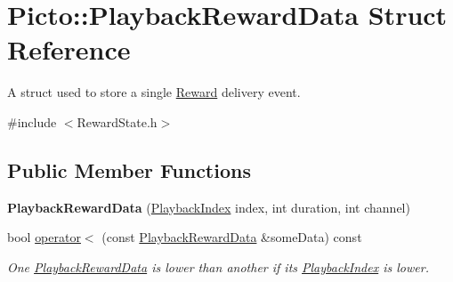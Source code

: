 \hypertarget{struct_picto_1_1_playback_reward_data}{\section{Picto\-:\-:Playback\-Reward\-Data Struct Reference}
\label{struct_picto_1_1_playback_reward_data}
}


A struct used to store a single \hyperlink{class_picto_1_1_reward}{Reward} delivery event.  




{\ttfamily \#include $<$Reward\-State.\-h$>$}

\subsection*{Public Member Functions}
\begin{DoxyCompactItemize}
\item 
\hypertarget{struct_picto_1_1_playback_reward_data_a202b354b57ffa3110ba5aca10c855423}{{\bfseries Playback\-Reward\-Data} (\hyperlink{struct_picto_1_1_playback_index}{Playback\-Index} index, int duration, int channel)}\label{struct_picto_1_1_playback_reward_data_a202b354b57ffa3110ba5aca10c855423}

\item 
\hypertarget{struct_picto_1_1_playback_reward_data_acc9bb8c39b32fb92303dd1486c3c102f}{bool \hyperlink{struct_picto_1_1_playback_reward_data_acc9bb8c39b32fb92303dd1486c3c102f}{operator$<$} (const \hyperlink{struct_picto_1_1_playback_reward_data}{Playback\-Reward\-Data} \&some\-Data) const }\label{struct_picto_1_1_playback_reward_data_acc9bb8c39b32fb92303dd1486c3c102f}

\begin{DoxyCompactList}\small\item\em One \hyperlink{struct_picto_1_1_playback_reward_data}{Playback\-Reward\-Data} is lower than another if its \hyperlink{struct_picto_1_1_playback_index}{Playback\-Index} is lower. \end{DoxyCompactList}\end{DoxyCompactItemize}
